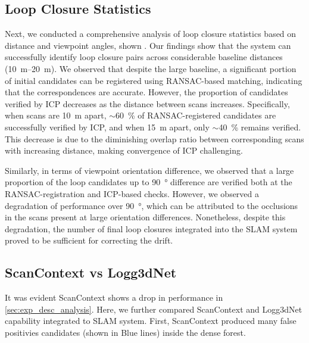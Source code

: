 \subsection{Loop Closure Statistics}
Next, we conducted a comprehensive analysis of loop closure statistics based on distance and viewpoint angles, shown . Our findings show that the system can successfully identify loop closure pairs across considerable baseline distances (\SIrange{10}{20}{\meter}). We observed that despite the large baseline, a significant portion of initial candidates can be registered using RANSAC-based matching, indicating that the correspondences are accurate. However, the proportion of candidates verified by ICP decreases as the distance between scans increases. Specifically, when scans are \SI{10}{\meter} apart, $\sim$\SI{60}{\percent} of RANSAC-registered candidates are successfully verified by ICP, and when \SI{15}{\meter} apart, only $\sim$\SI{40}{\percent} remains verified. This decrease is due to the diminishing overlap ratio between corresponding scans with increasing distance, making convergence of ICP challenging.

Similarly, in terms of viewpoint orientation difference, we observed that a large proportion of the loop candidates up to \SI{90}{\degree} difference are verified both at the RANSAC-registration and ICP-based checks. However, we observed a degradation of performance over \SI{90}{\degree}, which can be attributed to the occlusions in the scans present at large orientation differences. Nonetheless, despite this degradation, the number of final loop closures integrated into the SLAM system proved to be sufficient for correcting the drift.   




\subsection{ScanContext vs Logg3dNet} 
It was evident ScanContext shows a drop in performance in \ref{sec:exp_desc_analysis}. Here, we further compared ScanContext and Logg3dNet capability integrated to SLAM system. First, ScanContext produced many false positivies candidates (shown in Blue lines) inside the dense forest.   


